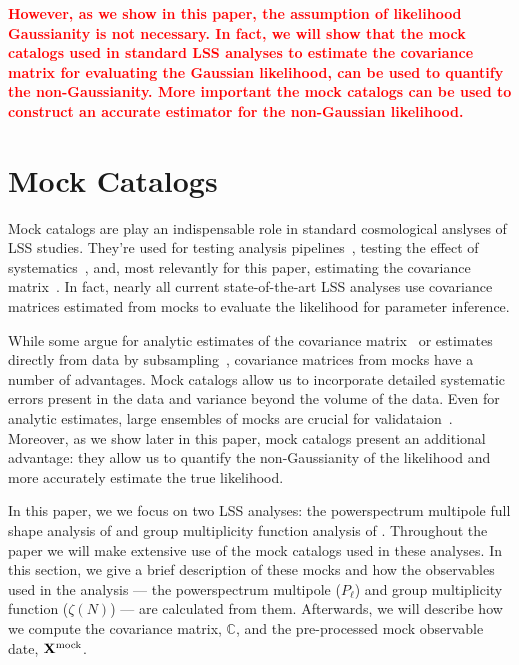 \documentclass[12pt, letterpaper, preprint]{aastex}
\newcommand{\todo}[1]{{\bf \textcolor{red}{#1}}}
\begin{document}
\todo{However, as we show in this paper, the assumption of likelihood 
Gaussianity is not necessary. In fact, we will show that the mock catalogs 
used in standard LSS analyses to estimate the covariance matrix for 
evaluating the Gaussian likelihood, can be used to quantify the non-Gaussianity. 
More important the mock catalogs can be used to construct an accurate 
estimator for the non-Gaussian likelihood.} 

\section{Mock Catalogs}
Mock catalogs are play an indispensable role in standard cosmological 
anslyses of LSS studies. They're used for testing analysis 
pipelines~\citep[][]{beutler2017, grieb2017, tinkerinpreparation}, 
testing the effect of systematics~\citep{guo2012, vargas-magana2014, hahn2017, pinol2017, ross2017}, 
and, most relevantly for this paper, estimating the covariance 
matrix~\citep[][]{parkinson2012, kazin2014, grieb2017, alam2017, beutler2017, sinha2017a}. 
In fact, nearly all current state-of-the-art LSS analyses use
covariance matrices estimated from mocks to evaluate the likelihood 
for parameter inference. 

While some argue for analytic estimates of the covariance 
matrix~\citep[e.g.][]{mohammed2017} or estimates directly from data
by subsampling~\citep[e.g.][]{norberg2009}, covariance matrices 
from mocks have a number of advantages. Mock catalogs allow us 
to incorporate detailed systematic errors present in the 
data and variance beyond the volume of the data. Even for analytic 
estimates, large ensembles of mocks are crucial for validataion~\citep{slepian2017}. 
Moreover, as we show later in this paper, mock catalogs present an
additional advantage: they allow us to 
quantify the non-Gaussianity of the likelihood and more accurately 
estimate the true likelihood. 

In this paper, we we focus on two LSS analyses: the powerspectrum 
multipole full shape analysis of \cite{beutler2017} and group multiplicity 
function analysis of \cite{sinha2017a}. Throughout the paper we will 
make extensive use of the mock catalogs used in these analyses. 
In this section, we give a brief description of these mocks and how 
the observables used in the analysis --- the powerspectrum 
multipole ($P_\ell$) and group multiplicity function ($\zeta(N)$) ---
are calculated from them. Afterwards, we will describe how we compute 
the covariance matrix, $\mathbb{C}$, and the pre-processed mock observable
date, ${\bf X}^\mathrm{mock}$.
\end{document}
